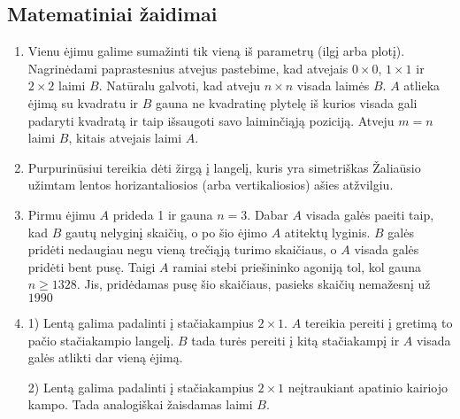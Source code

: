 \subsection*{Matematiniai žaidimai}
\begin{enumerate}
\item
Vienu ėjimu galime sumažinti tik vieną iš parametrų (ilgį arba plotį).
Nagrinėdami paprastesnius atvejus pastebime, kad atvejais $0\times 0$,
$1\times 1$ ir $2\times 2$ laimi $B$. Natūralu galvoti, kad atveju $n\times
n$ visada laimės $B$. $A$ atlieka ėjimą su kvadratu ir $B$ gauna ne kvadratinę
plytelę iš kurios visada gali padaryti kvadratą ir taip išsaugoti savo
laiminčiąją poziciją. Atveju $m=n$ laimi $B$, kitais atvejais laimi $A$.
\item
Purpurinūsiui tereikia dėti žirgą į langelį, kuris yra simetriškas
Žaliaūsio užimtam lentos horizantaliosios (arba vertikaliosios) ašies
atžvilgiu. 
\item
 Pirmu ėjimu $A$ prideda 1 ir gauna $n=3$. Dabar $A$ visada galės paeiti
 taip, kad $B$ gautų nelyginį skaičių, o po šio ėjimo $A$ atitektų
 lyginis. $B$ galės pridėti nedaugiau negu vieną trečiąją turimo
 skaičiaus, o $A$ visada galės pridėti bent pusę. Taigi $A$ ramiai stebi
 priešininko agoniją tol, kol gauna $n\geq 1328$. Jis, pridėdamas pusę šio
 skaičiaus, pasieks skaičių nemažesnį už $1990$
\item
1) Lentą galima padalinti į stačiakampius $2\times 1$. $A$ tereikia
pereiti į gretimą to pačio stačiakampio langelį. $B$ tada turės pereiti į
kitą stačiakampį ir $A$ visada galės atlikti dar vieną ėjimą.  

2) Lentą galima padalinti į stačiakampius $2\times 1$ neįtraukiant
apatinio kairiojo kampo. Tada analogiškai žaisdamas laimi $B$.


\end{enumerate}
